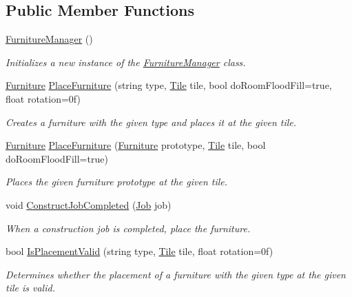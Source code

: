 \subsection*{Public Member Functions}
\begin{DoxyCompactItemize}
\item 
\hyperlink{class_furniture_manager_a761364a8580e4a11ed7b775a02f91bd8}{Furniture\+Manager} ()
\begin{DoxyCompactList}\small\item\em Initializes a new instance of the \hyperlink{class_furniture_manager}{Furniture\+Manager} class. \end{DoxyCompactList}\item 
\hyperlink{class_furniture}{Furniture} \hyperlink{class_furniture_manager_a4b40e2d1a5018e87a6985ffc7876a4e3}{Place\+Furniture} (string type, \hyperlink{class_tile}{Tile} tile, bool do\+Room\+Flood\+Fill=true, float rotation=0f)
\begin{DoxyCompactList}\small\item\em Creates a furniture with the given type and places it at the given tile. \end{DoxyCompactList}\item 
\hyperlink{class_furniture}{Furniture} \hyperlink{class_furniture_manager_ae7a63d95e4bb329ffa60d3e82852d895}{Place\+Furniture} (\hyperlink{class_furniture}{Furniture} prototype, \hyperlink{class_tile}{Tile} tile, bool do\+Room\+Flood\+Fill=true)
\begin{DoxyCompactList}\small\item\em Places the given furniture prototype at the given tile. \end{DoxyCompactList}\item 
void \hyperlink{class_furniture_manager_a011d3a18ca0bb2d2efc9e865cf65b1a3}{Construct\+Job\+Completed} (\hyperlink{class_job}{Job} job)
\begin{DoxyCompactList}\small\item\em When a construction job is completed, place the furniture. \end{DoxyCompactList}\item 
bool \hyperlink{class_furniture_manager_a358df1d08a99d84ea0905cc299d5365c}{Is\+Placement\+Valid} (string type, \hyperlink{class_tile}{Tile} tile, float rotation=0f)
\begin{DoxyCompactList}\small\item\em Determines whether the placement of a furniture with the given type at the given tile is valid. \end{DoxyCompactList}\item 

\end{DoxyCompactItemize}
